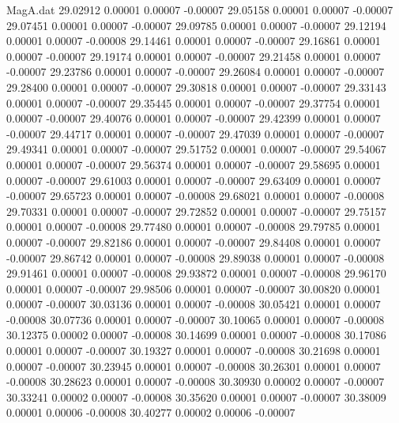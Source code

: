 \begin{filecontents}{MagA.dat}
  29.02912    0.00001    0.00007   -0.00007
  29.05158    0.00001    0.00007   -0.00007
  29.07451    0.00001    0.00007   -0.00007
  29.09785    0.00001    0.00007   -0.00007
  29.12194    0.00001    0.00007   -0.00008
  29.14461    0.00001    0.00007   -0.00007
  29.16861    0.00001    0.00007   -0.00007
  29.19174    0.00001    0.00007   -0.00007
  29.21458    0.00001    0.00007   -0.00007
  29.23786    0.00001    0.00007   -0.00007
  29.26084    0.00001    0.00007   -0.00007
  29.28400    0.00001    0.00007   -0.00007
  29.30818    0.00001    0.00007   -0.00007
  29.33143    0.00001    0.00007   -0.00007
  29.35445    0.00001    0.00007   -0.00007
  29.37754    0.00001    0.00007   -0.00007
  29.40076    0.00001    0.00007   -0.00007
  29.42399    0.00001    0.00007   -0.00007
  29.44717    0.00001    0.00007   -0.00007
  29.47039    0.00001    0.00007   -0.00007
  29.49341    0.00001    0.00007   -0.00007
  29.51752    0.00001    0.00007   -0.00007
  29.54067    0.00001    0.00007   -0.00007
  29.56374    0.00001    0.00007   -0.00007
  29.58695    0.00001    0.00007   -0.00007
  29.61003    0.00001    0.00007   -0.00007
  29.63409    0.00001    0.00007   -0.00007
  29.65723    0.00001    0.00007   -0.00008
  29.68021    0.00001    0.00007   -0.00008
  29.70331    0.00001    0.00007   -0.00007
  29.72852    0.00001    0.00007   -0.00007
  29.75157    0.00001    0.00007   -0.00008
  29.77480    0.00001    0.00007   -0.00008
  29.79785    0.00001    0.00007   -0.00007
  29.82186    0.00001    0.00007   -0.00007
  29.84408    0.00001    0.00007   -0.00007
  29.86742    0.00001    0.00007   -0.00008
  29.89038    0.00001    0.00007   -0.00008
  29.91461    0.00001    0.00007   -0.00008
  29.93872    0.00001    0.00007   -0.00008
  29.96170    0.00001    0.00007   -0.00007
  29.98506    0.00001    0.00007   -0.00007
  30.00820    0.00001    0.00007   -0.00007
  30.03136    0.00001    0.00007   -0.00008
  30.05421    0.00001    0.00007   -0.00008
  30.07736    0.00001    0.00007   -0.00007
  30.10065    0.00001    0.00007   -0.00008
  30.12375    0.00002    0.00007   -0.00008
  30.14699    0.00001    0.00007   -0.00008
  30.17086    0.00001    0.00007   -0.00007
  30.19327    0.00001    0.00007   -0.00008
  30.21698    0.00001    0.00007   -0.00007
  30.23945    0.00001    0.00007   -0.00008
  30.26301    0.00001    0.00007   -0.00008
  30.28623    0.00001    0.00007   -0.00008
  30.30930    0.00002    0.00007   -0.00007
  30.33241    0.00002    0.00007   -0.00008
  30.35620    0.00001    0.00007   -0.00007
  30.38009    0.00001    0.00006   -0.00008
  30.40277    0.00002    0.00006   -0.00007

\end{filecontents}
